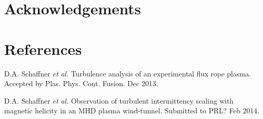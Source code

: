 \documentclass[aip,prl,amsmath,amssymb,reprint,superscriptaddress]{revtex4-1} %
\begin{document}
\section*{Acknowledgements}
\section*{References}
\begin{thebibliography}{99}

 D.A. Schaffner {\it et al.} Turbulence analysis of an experimental flux rope plasma. Accepted by Plas. Phys. Cont. Fusion. Dec 2013.

 D.A. Schaffner {\it et al.} Observation of turbulent intermittency scaling with magnetic helicity in an MHD plasma wind-tunnel. Submitted to PRL? Feb 2014.









\end{thebibliography}
\end{document}
